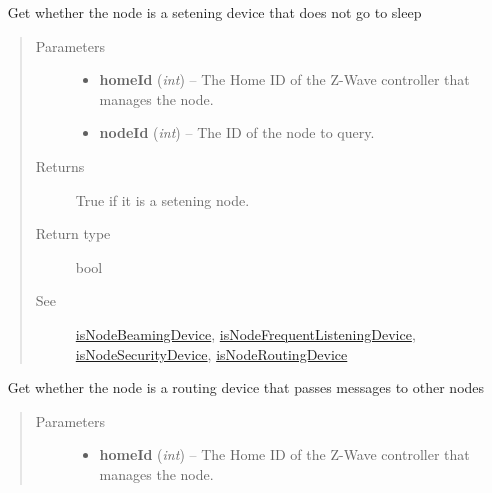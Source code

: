 \documentclass[letterpaper,10pt,english]{sphinxmanual}
\begin{document}
\begin{fulllineitems}
\begin{fulllineitems}
\label{libopenzwave:libopenzwave.PyManager.isNodeListeningDevice}~\label{libopenzwave:isnodelisteningdevice}
Get whether the node is a setening device that does not go to sleep
\begin{quote}\begin{description}
\item[{Parameters}] \leavevmode\begin{itemize}
\item {} 
\textbf{homeId} (\emph{int}) -- The Home ID of the Z-Wave controller that manages the node.

\item {} 
\textbf{nodeId} (\emph{int}) -- The ID of the node to query.

\end{itemize}

\item[{Returns}] \leavevmode
True if it is a setening node.

\item[{Return type}] \leavevmode
bool

\item[{See}] \leavevmode
{\hyperref[libopenzwave:isnodebeamingdevice]{isNodeBeamingDevice}}, {\hyperref[libopenzwave:isnodefrequentlisteningdevice]{isNodeFrequentListeningDevice}}, {\hyperref[libopenzwave:isnodesecuritydevice]{isNodeSecurityDevice}}, {\hyperref[libopenzwave:isnoderoutingdevice]{isNodeRoutingDevice}}

\end{description}\end{quote}

\end{fulllineitems}


\begin{fulllineitems}
\label{libopenzwave:libopenzwave.PyManager.isNodeRoutingDevice}~\label{libopenzwave:isnoderoutingdevice}
Get whether the node is a routing device that passes messages to other nodes
\begin{quote}\begin{description}
\item[{Parameters}] \leavevmode\begin{itemize}
\item {} 
\textbf{homeId} (\emph{int}) -- The Home ID of the Z-Wave controller that manages the node.


\end{itemize}
\end{description}
\end{quote}
\end{fulllineitems}
\end{fulllineitems}
\end{document}
